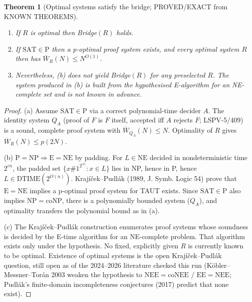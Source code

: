 \documentclass[11pt]{article}
\newtheorem{theorem}{Theorem}
\theoremstyle{definition}
\newcommand{\Wbar}{\overline W}
\begin{document}
\begin{theorem}[Optimal systems satisfy the bridge; PROVED/EXACT from KNOWN THEOREMS]\label{thm:optimal}
\begin{enumerate}
\item[(a)] If $R$ is optimal then Bridge$(R)$ holds.
\item[(b)] If $\mathrm{SAT}\in\mathrm P$ then a p-optimal proof system exists, and every optimal system $R$ then has $\Wbar_R(N)\le N^{O(1)}$.
\item[(c)] Nevertheless, (b) does not yield Bridge$(R)$ for any \emph{preselected} $R$. The system produced in (b) is built from the hypothesised E-algorithm for an NE-complete set and is not known in advance.
\end{enumerate}
\end{theorem}
\begin{proof}
(a) Assume $\mathrm{SAT}\in\mathrm P$ via a correct polynomial-time decider $A$. The identity system $Q_A$ (proof of $F$ is $F$ itself, accepted iff $A$ rejects $F$; LSPV-5/409) is a sound, complete proof system with $\Wbar_{Q_A}(N)\le N$. Optimality of $R$ gives $\Wbar_R(N)\le p(2N)$.

(b) $\mathrm P=\mathrm{NP}\Rightarrow\mathrm E=\mathrm{NE}$ by padding. For $L\in\mathrm{NE}$ decided in nondeterministic time $2^{cn}$, the padded set $\{x\#1^{2^{|x|}}:x\in L\}$ lies in NP, hence in P, hence $L\in\mathrm{DTIME}(2^{O(n)})$. Krajíček--Pudl\'ak (1989, J. Symb. Logic 54) prove that $\mathrm E=\mathrm{NE}$ implies a p-optimal proof system for TAUT exists. Since $\mathrm{SAT}\in\mathrm P$ also implies $\mathrm{NP}=\mathrm{coNP}$, there is a polynomially bounded system ($Q_A$), and optimality transfers the polynomial bound as in (a).

(c) The Krajíček--Pudl\'ak construction enumerates proof systems whose soundness is decided by the E-time algorithm for an NE-complete problem. That algorithm exists only under the hypothesis. No fixed, explicitly given $R$ is currently known to be optimal. Existence of optimal systems is the open Krajíček--Pudl\'ak question, still open as of the 2024--2026 literature checked this run (Köbler--Messner--Torán 2003 weaken the hypothesis to $\mathrm{NEE}=\mathrm{coNEE}$ / $\mathrm{EE}=\mathrm{NEE}$; Pudl\'ak's finite-domain incompleteness conjectures (2017) predict that none exist).
\end{proof}
\end{document}
